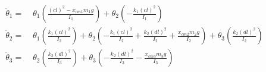 \documentclass[fontsize=11pt,
  paper=a4paper,
  twoside,
  captions=tableheading,
  index=totoc,
  hyperref]{labbook}
\begin{document}
\begin{addmargin}[4cm]{0cm}
\begin{equation}
\begin{aligned}
  \ddot{\theta}_1 =\; & \theta_1 \left( \frac{(cl)^2 - x_{cm1} m_1 g}{I_1} \right) + \theta_2 \left( -\frac{k_1 (cl)^2}{I_1} \right) \\
  \ddot{\theta}_2 =\; & \theta_1 \left( \frac{k_1 (cl)^2}{I_2} \right) + \theta_2 \left( -\frac{k_1 (cl)^2}{I_2} + \frac{k_2 (dl)^2}{I_2} + \frac{x_{cm2} m_2 g}{I_2} \right) + \theta_3 \left( \frac{k_2 (dl)^2}{I_2} \right) \\
  \ddot{\theta}_3 =\; & \theta_2 \left( \frac{k_2 (dl)^2}{I_3} \right) + \theta_3 \left( -\frac{k_2 (dl)^2}{I_3} - \frac{x_{cm3} m_3 g}{I_3} \right)
  \end{aligned}
\end{equation}






\end{addmargin}


\end{document}
